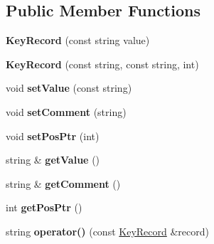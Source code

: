 \subsection*{\-Public \-Member \-Functions}
\begin{DoxyCompactItemize}
\item 
\hypertarget{structKeyRecord_adb2df461920a68e399eb275601b4162d}{{\bfseries \-Key\-Record} (const string value)}\label{dc/dfa/structKeyRecord_adb2df461920a68e399eb275601b4162d}

\item 
\hypertarget{structKeyRecord_adf859a9e00ca7a1f5b217d0b498e22fe}{{\bfseries \-Key\-Record} (const string, const string, int)}\label{dc/dfa/structKeyRecord_adf859a9e00ca7a1f5b217d0b498e22fe}

\item 
\hypertarget{structKeyRecord_a8ae401ed4c0eff987d128b35087d96a1}{void {\bfseries set\-Value} (const string)}\label{dc/dfa/structKeyRecord_a8ae401ed4c0eff987d128b35087d96a1}

\item 
\hypertarget{structKeyRecord_a63587c62d362bfc8daa56aeec9d4c4f8}{void {\bfseries set\-Comment} (string)}\label{dc/dfa/structKeyRecord_a63587c62d362bfc8daa56aeec9d4c4f8}

\item 
\hypertarget{structKeyRecord_adee7f01f8d7b854a3ee122b3e949c8c2}{void {\bfseries set\-Pos\-Ptr} (int)}\label{dc/dfa/structKeyRecord_adee7f01f8d7b854a3ee122b3e949c8c2}

\item 
\hypertarget{structKeyRecord_a6d7e9380759ddb6f1acf7f5f8e10d740}{string \& {\bfseries get\-Value} ()}\label{dc/dfa/structKeyRecord_a6d7e9380759ddb6f1acf7f5f8e10d740}

\item 
\hypertarget{structKeyRecord_aa60c71d2a54153e4cff53b415cc4a110}{string \& {\bfseries get\-Comment} ()}\label{dc/dfa/structKeyRecord_aa60c71d2a54153e4cff53b415cc4a110}

\item 
\hypertarget{structKeyRecord_a90bf6993ecf929f2e9c4d6e388708c50}{int {\bfseries get\-Pos\-Ptr} ()}\label{dc/dfa/structKeyRecord_a90bf6993ecf929f2e9c4d6e388708c50}

\item 
\hypertarget{structKeyRecord_aeb4414945e397b7e8be240a96fa99723}{string {\bfseries operator()} (const \hyperlink{structKeyRecord}{\-Key\-Record} \&record)}\label{dc/dfa/structKeyRecord_aeb4414945e397b7e8be240a96fa99723}

\end{DoxyCompactItemize}
